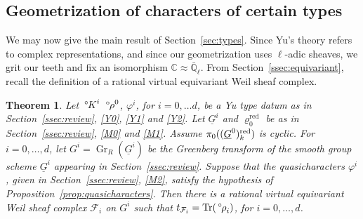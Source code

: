 \documentclass[10pt]{amsart}
\theoremstyle{plain}
\newtheorem{theorem}{Theorem}[section]
\theoremstyle{definition}
\newcommand{\CC}{{\mathbb{C}}}
\newcommand{\EE}{\mathbb{\bar Q}_\ell}
\newcommand{\Fq}{k}
\DeclareMathOperator{\Gr}{Gr}
\DeclareMathOperator{\trace}{Tr}
\newcommand{\trFrob}[1]{t_{#1}}
\newcommand{\cs}[1]{{\mathcal{#1}}}
\newcommand{\red}{^{\operatorname{red}}}
\newcommand{\oK}{{\,^\circ \hskip-1pt K}}
\newcommand{\orho}{{\,^\circ \hskip-1pt \rho}}
\begin{document}
\subsection{Geometrization of characters of certain types}\label{ssec:geotypes}

We may now give the main result of Section~\ref{sec:types}.
%
Since Yu's theory refers to complex representations, and since our geometrization uses $\ell$-adic sheaves, we grit our teeth and fix an isomorphism $\CC \approx \EE$.
From Section~\ref{ssec:equivariant}, recall the definition of a rational virtual equivariant Weil sheaf complex.

\begin{theorem}\label{thm:geotypes}
Let $\oK^i$ $\orho^0$, $\varphi^i$, for $i=0, \ldots d$, be a Yu type datum as in Section~\ref{ssec:review}, \ref{Y0}, \ref{Y1} and \ref{Y2}.
Let $\underline{G}^i$ and $\varrho_0\red$ be as in Section~\ref{ssec:review}, \ref{M0} and \ref{M1}.
Assume $\pi_0((\underline{G}^0)_\Fq^\reductive)$ is cyclic.
For $i=0, \ldots ,d$, let $G^i = \Gr_{R}(\underline{G}^i)$ be the Greenberg transform of the smooth group scheme $\underline{G}^i$ appearing in Section~\ref{ssec:review}.
Suppose that the quasicharacters $\varphi^i$, given in Section~\ref{ssec:review}, \ref{M2}, satisfy the hypothesis of Proposition~\ref{prop:quasicharacters}.
Then there is a rational virtual equivariant Weil sheaf complex $\cs{F}_i$ on $G^i$ such that $\trFrob{\cs{F}_i} = \trace(\orho_i)$, for $i=0, \ldots , d$.
\end{theorem}
\end{document}
